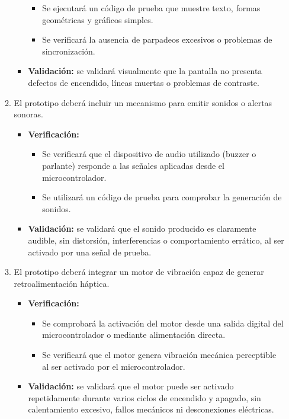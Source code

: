 \documentclass[
11pt, %
]{charter}
\begin{document}
\begin{enumerate}
\begin{enumerate}
\begin{itemize}
\begin{itemize}
				\item Se ejecutará un código de prueba que muestre texto, formas geométricas y gráficos simples.                                     
				\item Se verificará la ausencia de parpadeos excesivos o problemas de sincronización.
			\end{itemize}
			\item \textbf{Validación:} se validará visualmente que la pantalla no presenta defectos de encendido, líneas muertas o problemas de contraste.
		\end{itemize}		
		\item El prototipo deberá incluir un mecanismo para emitir sonidos o alertas sonoras. %
		\begin{itemize}
			\item \textbf{Verificación:} 
			\begin{itemize}
				\item Se verificará que el dispositivo de audio utilizado (buzzer o parlante) responde a las señales aplicadas desde el microcontrolador.                                     
				\item Se utilizará un código de prueba para comprobar la generación de sonidos.
			\end{itemize}
			\item \textbf{Validación:} se validará que el sonido producido es claramente audible, sin distorsión, interferencias o comportamiento errático, al ser activado por una señal de prueba.
		\end{itemize}		
		\item El prototipo deberá integrar un motor de vibración capaz de generar retroalimentación háptica. %
		\begin{itemize}
			\item \textbf{Verificación:} 
			\begin{itemize}
				\item Se comprobará la activación del motor desde una salida digital del microcontrolador o mediante alimentación directa.                                     
				\item Se verificará que el motor genera vibración mecánica perceptible al ser activado por el microcontrolador.
			\end{itemize}
			\item \textbf{Validación:} se validará que el motor puede ser activado repetidamente durante varios ciclos de encendido y apagado, sin calentamiento excesivo, fallos mecánicos ni desconexiones eléctricas.

\end{itemize}
\end{enumerate}
\end{enumerate}
\end{document}
